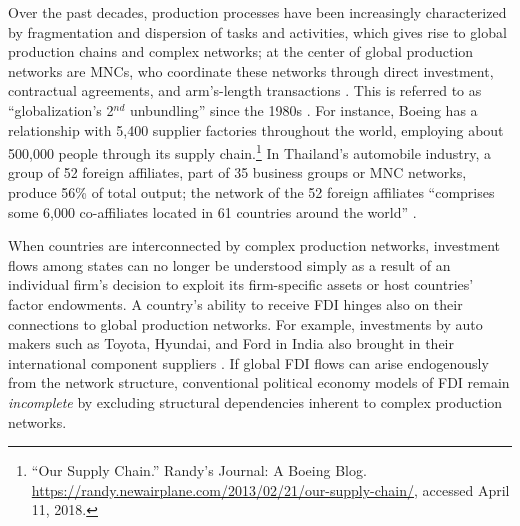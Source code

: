 \documentclass[reqno,onecolumn,letterpaper,12pt]{article}
\begin{document}
Over the past decades, production processes have been increasingly characterized by fragmentation and dispersion of tasks and activities, which gives rise to global production chains and complex networks; at the center of global production networks are MNCs, who coordinate these networks through direct investment, contractual agreements, and arm's-length transactions \citep{UNCTAD:2013}.  This is referred to as ``globalization's 2$^{nd}$ unbundling'' since the 1980s \citep{Baldwin:2011}. %
For instance, Boeing has a relationship with 5,400 supplier factories throughout the world, employing about 500,000 people through its supply chain.\footnote{``Our Supply Chain.'' Randy's Journal: A Boeing Blog. \url{https://randy.newairplane.com/2013/02/21/our-supply-chain/}, accessed April 11, 2018.} In Thailand's automobile industry, a group of 52 foreign affiliates, part of 35 business groups or MNC networks, produce 56\% of total output; the network of the 52 foreign affiliates ``comprises some 6,000 co-affiliates located in 61 countries around the world'' \citep[137]{UNCTAD:2013}.

When countries are interconnected by complex production networks, investment flows among states can no longer be understood simply as a result of an individual firm's decision to exploit its firm-specific assets or host countries' factor endowments. A country's ability to receive FDI hinges also on their connections to global production networks. For example, investments by auto makers such as Toyota, Hyundai, and Ford in India also brought in their international component suppliers \citep[23]{Moran:2014}. If global FDI flows can arise endogenously from the network structure, conventional political economy models of FDI remain \textit{incomplete} by excluding structural dependencies inherent to complex production networks.

\end{document}
